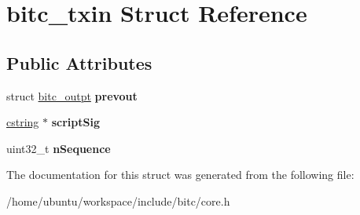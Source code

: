 \hypertarget{structbitc__txin}{\section{bitc\-\_\-txin Struct Reference}
\label{structbitc__txin}
}
\subsection*{Public Attributes}
\begin{DoxyCompactItemize}
\item 
\hypertarget{structbitc__txin_a6caf1bad15db0019f572711d57bb66a0}{struct \hyperlink{structbitc__outpt}{bitc\-\_\-outpt} {\bfseries prevout}}\label{structbitc__txin_a6caf1bad15db0019f572711d57bb66a0}

\item 
\hypertarget{structbitc__txin_a4f1cee77a0a2ed481d430617f9aae13b}{\hyperlink{structcstring}{cstring} $\ast$ {\bfseries script\-Sig}}\label{structbitc__txin_a4f1cee77a0a2ed481d430617f9aae13b}

\item 
\hypertarget{structbitc__txin_a8e73a556bced4ef996b974604a4f1e86}{uint32\-\_\-t {\bfseries n\-Sequence}}\label{structbitc__txin_a8e73a556bced4ef996b974604a4f1e86}

\end{DoxyCompactItemize}


The documentation for this struct was generated from the following file\-:\begin{DoxyCompactItemize}
\item 
/home/ubuntu/workspace/include/bitc/core.\-h\end{DoxyCompactItemize}
